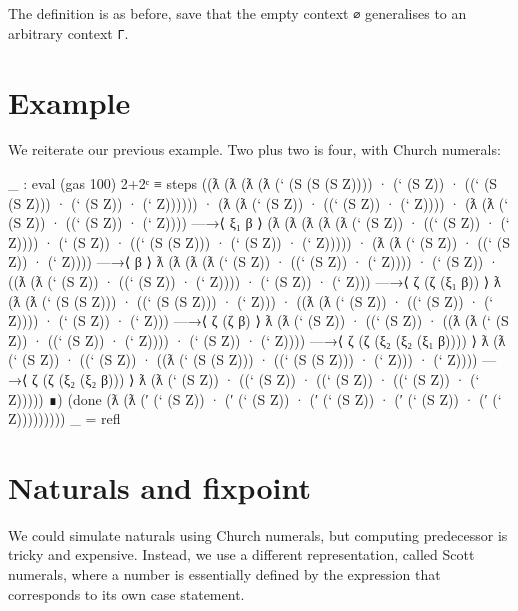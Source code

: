 The definition is as before, save that the empty context \texttt{∅}
generalises to an arbitrary context \texttt{Γ}.

\hypertarget{example}{%
\section{Example}\label{example}}

We reiterate our previous example. Two plus two is four, with Church
numerals:

\begin{fence}
\begin{code}
_ : eval (gas 100) 2+2ᶜ ≡
  steps
   ((ƛ
     (ƛ
      (ƛ
       (ƛ
        (` (S (S (S Z)))) · (` (S Z)) ·
        ((` (S (S Z))) · (` (S Z)) · (` Z))))))
    · (ƛ (ƛ (` (S Z)) · ((` (S Z)) · (` Z))))
    · (ƛ (ƛ (` (S Z)) · ((` (S Z)) · (` Z))))
   —→⟨ ξ₁ β ⟩
    (ƛ
     (ƛ
      (ƛ
       (ƛ (ƛ (` (S Z)) · ((` (S Z)) · (` Z)))) · (` (S Z)) ·
       ((` (S (S Z))) · (` (S Z)) · (` Z)))))
    · (ƛ (ƛ (` (S Z)) · ((` (S Z)) · (` Z))))
   —→⟨ β ⟩
    ƛ
    (ƛ
     (ƛ (ƛ (` (S Z)) · ((` (S Z)) · (` Z)))) · (` (S Z)) ·
     ((ƛ (ƛ (` (S Z)) · ((` (S Z)) · (` Z)))) · (` (S Z)) · (` Z)))
   —→⟨ ζ (ζ (ξ₁ β)) ⟩
    ƛ
    (ƛ
     (ƛ (` (S (S Z))) · ((` (S (S Z))) · (` Z))) ·
     ((ƛ (ƛ (` (S Z)) · ((` (S Z)) · (` Z)))) · (` (S Z)) · (` Z)))
   —→⟨ ζ (ζ β) ⟩
    ƛ
    (ƛ
     (` (S Z)) ·
     ((` (S Z)) ·
      ((ƛ (ƛ (` (S Z)) · ((` (S Z)) · (` Z)))) · (` (S Z)) · (` Z))))
   —→⟨ ζ (ζ (ξ₂ (ξ₂ (ξ₁ β)))) ⟩
    ƛ
    (ƛ
     (` (S Z)) ·
     ((` (S Z)) ·
      ((ƛ (` (S (S Z))) · ((` (S (S Z))) · (` Z))) · (` Z))))
   —→⟨ ζ (ζ (ξ₂ (ξ₂ β))) ⟩
    ƛ (ƛ (` (S Z)) · ((` (S Z)) · ((` (S Z)) · ((` (S Z)) · (` Z)))))
   ∎)
   (done
    (ƛ
     (ƛ
      (′
       (` (S Z)) ·
       (′ (` (S Z)) · (′ (` (S Z)) · (′ (` (S Z)) · (′ (` Z)))))))))
_ = refl
\end{code}
\end{fence}

\hypertarget{naturals-and-fixpoint}{%
\section{Naturals and fixpoint}\label{naturals-and-fixpoint}}

We could simulate naturals using Church numerals, but computing
predecessor is tricky and expensive. Instead, we use a different
representation, called Scott numerals, where a number is essentially
defined by the expression that corresponds to its own case statement.

